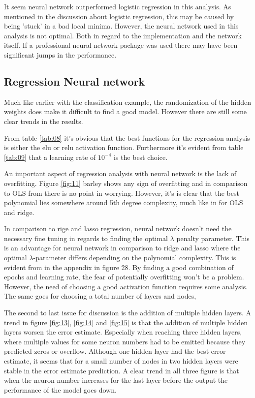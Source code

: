 \documentclass[uio,jmp,amsmath,amssymb,reprint,nofootinbib]{revtex4-1}
\numberwithin{equation}{section}
\begin{document}
It seem neural network outperformed logistic regression in this analysis. As mentioned in the discussion about logistic regression, this may be caused by being 'stuck' in a bad local minima. However, the neural network used in this analysis is not optimal. Both in regard to the implementation and the network itself. If a professional neural network package was used there may have been significant jumps in the performance.

\subsection{Regression Neural network}

Much like earlier with the classification example, the randomization of the hidden weights does make it difficult to find a good model. However there are still some clear trends in the results.

From table \ref{tab:08} it's obvious that the best functions for the regression analysis is either the elu or relu activation function. Furthermore it's evident from table \ref{tab:09} that a learning rate of \(10^{-4}\) is the best choice.

An important aspect of regression analysis with neural network is the lack of overfitting. Figure \ref{fig:11} barley shows any sign of overfitting and in comparison to OLS from \cite{Jon_P1} there is no point in worrying. However, it's is clear that the best polynomial lies somewhere around 5th degree complexity, much like in \cite{Jon_P1} for OLS and ridge. 

In comparison to rige and lasso regression, neural network doesn't need the necessary fine tuning in regards to finding the optimal \(\lambda\) penalty parameter. This is an advantage for neural network in comparison to ridge and lasso where the optimal \(\lambda\)-parameter differs depending on the polynomial complexity. This is evident from \cite{Jon_P1} in the appendix in figure 28. By finding a good combination of epochs and learning rate, the fear of potentially overfitting won't be a problem. However, the need of choosing a good activation function requires some analysis. The same goes for choosing a total number of layers and nodes,

The second to last issue for discussion is the addition of multiple hidden layers. A trend in figure \ref{fig:13}, \ref{fig:14} and \ref{fig:15} is that the addition of multiple hidden layers worsen the error estimate. Especially when reaching three hidden layers, where multiple values for some neuron numbers had to be emitted because they predicted zeros or overflow. Although one hidden layer had the best error estimate, it seems that for a small number of nodes in two hidden layers were stable in the error estimate prediction. A clear trend in all three figure is that when the neuron number increases for the last layer before the output the performance of the model goes down.
\end{document}
